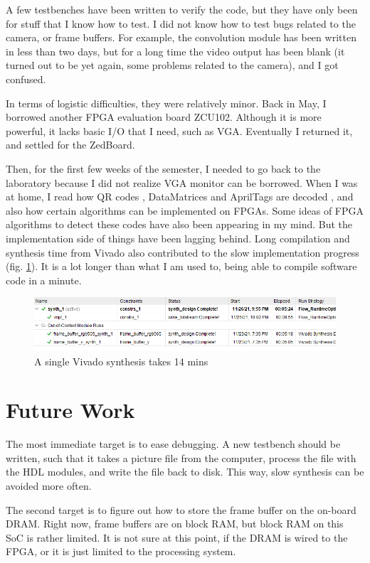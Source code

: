 \documentclass{IEEEtran}
\begin{document}
	A few testbenches have been written to verify the code, but they have only been for stuff that I know how to test. I did not know how to test bugs related to the camera, or frame buffers. For example, the convolution module has been written in less than two days, but for a long time the video output has been blank (it turned out to be yet again, some problems related to the camera), and I got confused.
	
	In terms of logistic difficulties, they were relatively minor. Back in May, I borrowed another FPGA evaluation board ZCU102. Although it is more powerful, it lacks basic I/O that I need, such as VGA. Eventually I returned it, and settled for the ZedBoard.
	
	Then, for the first few weeks of the semester, I needed to go back to the laboratory because I did not realize VGA monitor can be borrowed. When I was at home, I read how QR codes \cite{utube1}, DataMatrices\cite{utube2} and AprilTags are decoded \cite{apriltag}\cite{apriltag2}, and also how certain algorithms can be implemented on FPGAs. Some ideas of FPGA algorithms to detect these codes have also been appearing in my mind. But the implementation side of things have been lagging behind. Long compilation and synthesis time from Vivado also contributed to the slow implementation progress (fig. \ref{fig:vivado}). It is a lot longer than what I am used to, being able to compile software code in a minute.
	\begin{figure}[h]
		\centering
		\includegraphics[scale=0.4]{vivado}
		\caption{A single Vivado synthesis takes 14 mins}
		\label{fig:vivado}
	\end{figure}
	\section{Future Work}
	The most immediate target is to ease debugging. A new testbench should be written, such that it takes a picture file from the computer, process the file with the HDL modules, and write the file back to disk. This way, slow synthesis can be avoided more often.
	
	The second target is to figure out how to store the frame buffer on the on-board DRAM. Right now, frame buffers are on block RAM, but block RAM on this SoC is rather limited. It is not sure at this point, if the DRAM is wired to the FPGA, or it is just limited to the processing system.
	
\end{document}
